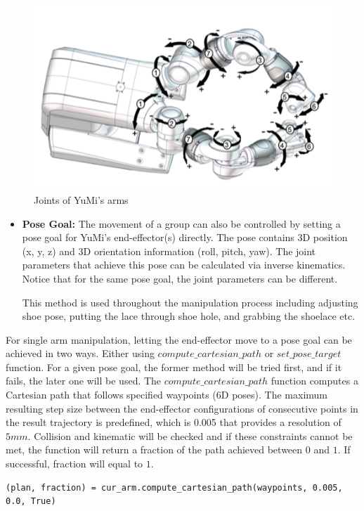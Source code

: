 \begin{figure}[H]
\centering
\includegraphics[width = 0.7\columnwidth]{Implementation/mp/yumijoints.png}
\caption{Joints of YuMi's arms \citep{Productspecification}}
\label{yumijoint}
\end{figure}

\begin{itemize}
    \item \textbf{Pose Goal:} The movement of a group can also be controlled by setting a pose goal for YuMi's end-effector(s) directly. The pose contains 3D position (x, y, z) and 3D orientation information (roll, pitch, yaw). The joint parameters that achieve this pose can be calculated via inverse kinematics. Notice that for the same pose goal, the joint parameters can be different.
    
    This method is used throughout the manipulation process including adjusting shoe pose, putting the lace through shoe hole, and grabbing the shoelace etc.
\end{itemize}

For single arm manipulation, letting the end-effector move to a pose goal can be achieved in two ways. Either using $compute\_cartesian\_path$ or $set\_pose\_target$ function. For a given pose goal, the former method will be tried first, and if it fails, the later one will be used. The $compute\_cartesian\_path$ function computes a Cartesian path that follows specified waypoints (6D poses). The maximum resulting step size between the end-effector configurations of consecutive points in the result trajectory is predefined, which is 0.005 that provides a resolution of $5mm$. Collision and kinematic will be checked and if these constraints cannot be met, the function will return a fraction of the path achieved between $0$ and $1$. If successful, fraction will equal to $1$.

\begin{verbatim}
(plan, fraction) = cur_arm.compute_cartesian_path(waypoints, 0.005, 0.0, True)
\end{verbatim}

